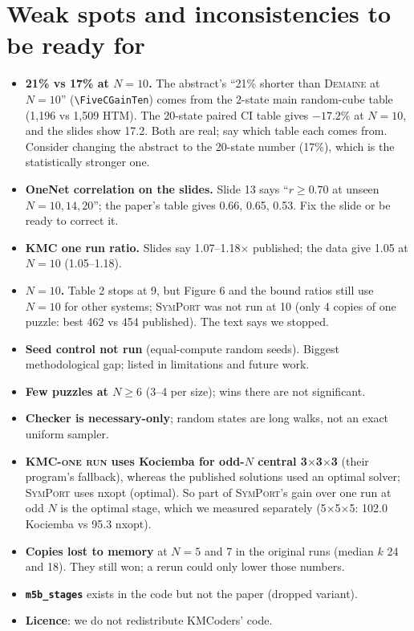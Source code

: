 \documentclass[10.5pt,a4paper]{article}
\newcommand{\Cu}[1]{#1$\times$#1$\times$#1}
\newcommand{\M}[1]{\textsc{#1}}
\begin{document}
\section{Weak spots and inconsistencies to be ready for}
\begin{warnbox}
\begin{itemize}
\item \textbf{21\% vs 17\% at $N=10$.} The abstract's ``21\% shorter than \M{Demaine} at $N=10$'' (\texttt{\textbackslash FiveCGainTen})
comes from the 2-state main random-cube table (1,196 vs 1,509 HTM). The 20-state paired CI table gives $-17.2\%$ at $N=10$, and the
slides show 17.2. Both are real; say which table each comes from. Consider changing the abstract to the 20-state number (17\%), which
is the statistically stronger one.
\item \textbf{OneNet correlation on the slides.} Slide 13 says ``$r\ge0.70$ at unseen $N=10,14,20$''; the paper's table gives 0.66,
0.65, 0.53. Fix the slide or be ready to correct it.
\item \textbf{KMC one run ratio.} Slides say 1.07--1.18$\times$ published; the data give 1.05 at $N=10$ (1.05--1.18).
\item \textbf{$N=10$.} Table 2 stops at 9, but Figure 6 and the bound ratios still use $N=10$ for other systems; \M{SymPort} was not run
at 10 (only 4 copies of one puzzle: best 462 vs 454 published). The text says we stopped.
\item \textbf{Seed control not run} (equal-compute random seeds). Biggest methodological gap; listed in limitations and future work.
\item \textbf{Few puzzles at $N\ge6$} (3--4 per size); wins there are not significant.
\item \textbf{Checker is necessary-only}; random states are long walks, not an exact uniform sampler.
\item \textbf{\M{KMC-one run} uses Kociemba for odd-$N$ central \Cu{3}} (their program's fallback), whereas the published solutions used
an optimal solver; \M{SymPort} uses nxopt (optimal). So part of \M{SymPort}'s gain over one run at odd $N$ is the optimal stage, which
we measured separately (\Cu{5}: 102.0 Kociemba vs 95.3 nxopt).
\item \textbf{Copies lost to memory} at $N=5$ and 7 in the original runs (median $k$ 24 and 18). They still won; a rerun could only
lower those numbers.
\item \textbf{\texttt{m5b\_stages}} exists in the code but not the paper (dropped variant).
\item \textbf{Licence}: we do not redistribute KMCoders' code.
\end{itemize}
\end{warnbox}
\end{document}
